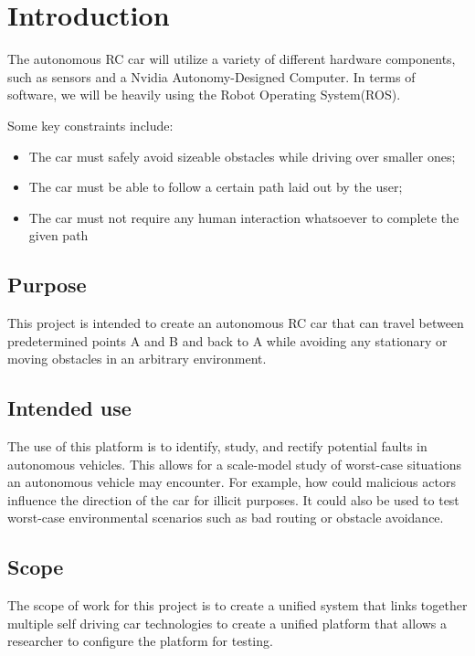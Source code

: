 \documentclass[onecolumn, draftclsnofoot,10pt]{IEEEtran}
\begin{document}
\clearpage



\section{Introduction}
    The autonomous RC car will utilize a variety of different hardware components, such as sensors and a Nvidia Autonomy-Designed Computer. In terms of software, we will be heavily using the Robot Operating System(ROS). 
    
    Some key constraints include: 
    \begin{itemize}
        \item The car must safely avoid sizeable obstacles while driving over smaller ones;
        \item The car must be able to follow a certain path laid out by the user;
        \item The car must not require any human interaction whatsoever to complete the given path
    \end{itemize}

\subsection{Purpose}
    This project is intended to create an autonomous RC car that can travel between predetermined points A and B and back to A while avoiding any stationary or moving obstacles in an arbitrary environment.
\bigskip

\subsection{Intended use}
    The use of this platform is to identify, study, and rectify potential faults in autonomous vehicles. This allows for a scale-model study of worst-case situations an autonomous vehicle may encounter. For example, how could malicious actors influence the direction of the car for illicit purposes. It could also be used to test worst-case environmental scenarios such as bad routing or obstacle avoidance.
\bigskip

\subsection{Scope}
    The scope of work for this project is to create a unified system that links together multiple self driving car technologies to create a unified platform that allows a researcher to configure the platform for testing.
\bigskip
\end{document}
